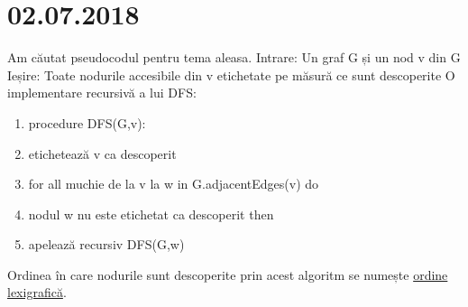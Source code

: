 \documentclass{report}
\begin{document}
\chapter{02.07.2018}
Am căutat pseudocodul pentru tema aleasa.\newline
\hspace*{0.5cm}Intrare: Un graf G și un nod v din G\newline
\hspace*{0.5cm}Ieșire: Toate nodurile accesibile din v etichetate pe măsură ce sunt descoperite\newline
\hspace*{0.5cm}O implementare recursivă a lui DFS:\newline
\begin{enumerate}
\item procedure DFS(G,v):
\item  etichetează v ca descoperit
\item  for all muchie de la v la w in G.adjacentEdges(v) do
\item    \hspace*{1cm} nodul w nu este etichetat ca descoperit then
\item     \hspace{1cm}apelează recursiv DFS(G,w)
\end{enumerate}
\hspace*{0.5cm}Ordinea în care nodurile sunt descoperite prin acest algoritm se numește \underline{ordine lexigrafică}.
\end{document}
